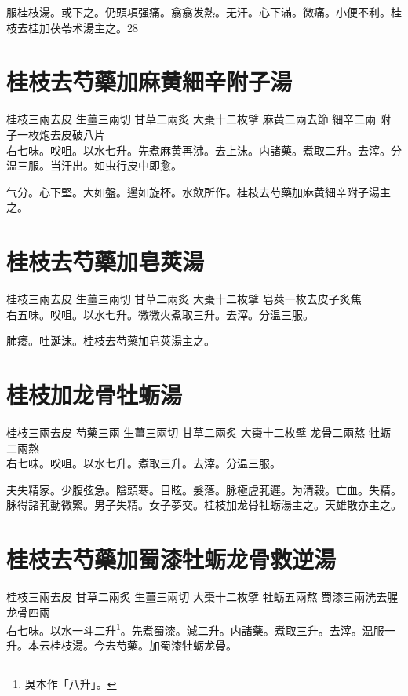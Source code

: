 服桂枝湯。{\khaai 或}下之。仍頭項强痛。翕翕发熱。无汗。心下滿。微痛。小便不利。桂枝去桂加茯苓术湯主之。28

\section{桂枝去芍藥加麻黄細辛附子湯}

桂枝{\scriptsize 三兩去皮} 生薑{\scriptsize 三兩切} 甘草{\scriptsize 二兩炙} 大棗{\scriptsize 十二枚擘} 麻黄{\scriptsize 二兩去節} 細辛{\scriptsize 二兩} 附子{\scriptsize 一枚炮去皮破八片}\\
右七味。㕮咀。以水七升。先煮麻黄再沸。去上沫。内諸藥。煮取二升。去滓。分温三服。当汗出。如虫行皮中即愈。

气分。心下堅。大如盤。邊如旋杯。水飲所作。桂枝去芍藥加麻黄細辛附子湯主之。

\section{桂枝去芍藥加皂莢湯}

桂枝{\scriptsize 三兩去皮} 生薑{\scriptsize 三兩切} 甘草{\scriptsize 二兩炙} 大棗{\scriptsize 十二枚擘} 皂莢{\scriptsize 一枚去皮子炙焦}\\
右五味。㕮咀。以水七升。微微火煮取三升。去滓。分温三服。

肺痿。吐涎沫。桂枝去芍藥加皂莢湯主之。

\section{桂枝加龙骨牡蛎湯}

桂枝{\scriptsize 三兩去皮} 芍藥{\scriptsize 三兩} 生薑{\scriptsize 三兩切} 甘草{\scriptsize 二兩炙} 大棗{\scriptsize 十二枚擘} 龙骨{\scriptsize 二兩熬} 牡蛎{\scriptsize 二兩熬}\\
右七味。㕮咀。以水七升。煮取三升。去滓。分温三服。

夫失精家。少腹弦急。陰頭寒。目眩。髮落。脉極虗芤遲。为清穀。亡血。失精。脉得諸芤動微緊。男子失精。女子夢交。桂枝加龙骨牡蛎湯主之。天雄散亦主之。

\section{桂枝去芍藥加蜀漆牡蛎龙骨救逆湯}

桂枝{\scriptsize 三兩去皮} 甘草{\scriptsize 二兩炙} 生薑{\scriptsize 三兩切} 大棗{\scriptsize 十二枚擘} 牡蛎{\scriptsize 五兩熬} 蜀漆{\scriptsize 三兩洗去腥} 龙骨{\scriptsize 四兩}\\
右七味。以水一斗二升{\footnote{吳本作「八升」。}}。先煮蜀漆。減二升。内諸藥。煮取三升。去滓。温服一升。本云桂枝湯。今去芍藥。加蜀漆牡蛎龙骨。

